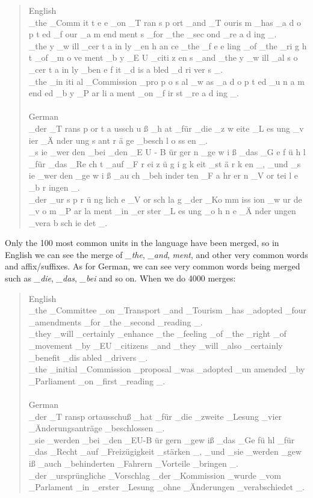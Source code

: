 \begin{quote}
	English\\
	\_the \_Comm it t e e \_on \_T ran s p ort \_and \_T ouris m \_has \_a d o p t ed \_f our \_a m end ment s \_for \_the \_sec ond \_re a d ing \_.\\
	\_the y \_w ill \_cer t a in ly \_en h an ce \_the \_f e e ling \_of \_the \_ri g h t \_of \_m o ve ment \_b y \_E U \_citi z en s \_and \_the y \_w ill \_al s o \_cer t a in ly \_ben e f it \_d is a bled \_d ri ver s \_.\\
	\_the \_in iti al \_Commission \_pro p o s al \_w as \_a d o p t ed \_u n a m end ed \_b y \_P ar li a ment \_on \_f ir st \_re a d ing \_.\\\\
	German\\
	\_der \_T rans p or t a ussch u ß \_h at \_für \_die \_z w eite \_L es ung \_v ier \_Ä nder ung s ant r ä ge \_besch l o ss en \_.\\
	\_s ie \_wer den \_bei \_den \_E U - B ür ger n \_ge w i ß \_das \_G e f ü h l \_für \_das \_Re ch t \_auf \_F r ei z ü g i g k eit \_st ä r k en \_, \_und \_s ie \_wer den \_ge w i ß \_au ch \_beh inder ten \_F a hr er n \_V or tei l e \_b r ingen \_.\\
	\_der \_ur s p r ü ng lich e \_V or sch la g \_der \_Ko mm iss ion \_w ur de \_v o m \_P ar la ment \_in \_er ster \_L es ung \_o h n e \_Ä nder ungen \_vera b sch ie det \_.\\
\end{quote}

Only the 100 most common units in the language have been merged, so in English we can see the merge of \emph{\_the}, \emph{\_and}, \emph{ment}, and other very common words and affix/suffixes. As for German, we can see very common words being merged such as \emph{\_die}, \emph{\_das}, \emph{\_bei} and so on. When we do 4000 merges:

\begin{quote}
	English\\
	\_the \_Committee \_on \_Transport \_and \_Tourism \_has \_adopted \_four \_amendments \_for \_the \_second \_reading \_.\\
	\_they \_will \_certainly \_enhance \_the \_feeling \_of \_the \_right \_of \_movement \_by \_EU \_citizens \_and \_they \_will \_also \_certainly \_benefit \_dis abled \_drivers \_.\\
	\_the \_initial \_Commission \_proposal \_was \_adopted \_un amended \_by \_Parliament \_on \_first \_reading \_.\\\\
	German\\
	\_der \_T ransp ortausschuß \_hat \_für \_die \_zweite \_Lesung \_vier \_Änderungsanträge \_beschlossen \_.\\
	\_sie \_werden \_bei \_den \_EU-B ür gern \_gew iß \_das \_Ge fü hl \_für \_das \_Recht \_auf \_Freizügigkeit \_stärken \_, \_und \_sie \_werden \_gew iß \_auch \_behinderten \_Fahrern \_Vorteile \_bringen \_.\\
	\_der \_ursprüngliche \_Vorschlag \_der \_Kommission \_wurde \_vom \_Parlament \_in \_erster \_Lesung \_ohne \_Änderungen \_verabschiedet \_.
\end{quote}

